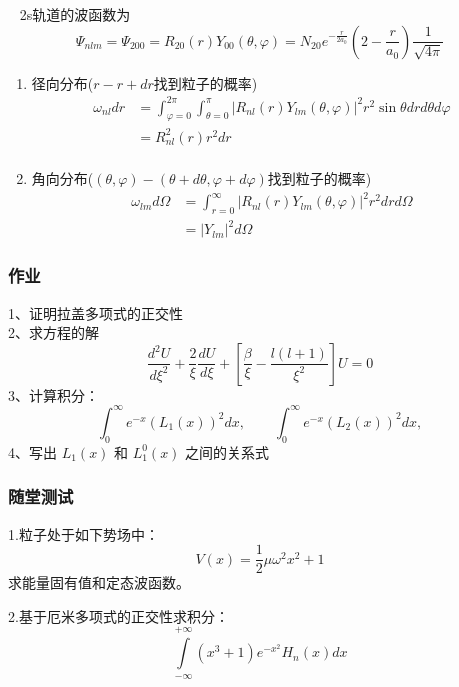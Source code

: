\begin{frame}
	  \frametitle{}
	  \例 [1.求2s轨道的形态]{}
	  \解~ 2s轨道的波函数为\[  \Psi_{nlm} = \Psi_{200} = R_{20} (r) Y_{00}(\theta,\varphi) = N_{20} e^{-\frac{r}{2a_0}} (2-\frac{r}{a_0})\frac{1}{\sqrt{4\pi}}\]
	  \begin{enumerate}
		  \item 径向分布($r-r+dr$找到粒子的概率)
		   \[ \begin{aligned}
	    \omega_{nl} dr &= \int _{\varphi=0} ^{2\pi} \int _{\theta=0} ^{\pi} |R_{nl}(r)Y_{lm}(\theta,\varphi)|^2 r^2\sin \theta dr d\theta d \varphi \\
		&= R^2_{nl}(r) r^2 dr \\
		\end{aligned}\]
		\item 角向分布($(\theta,\varphi)-(\theta+d\theta,\varphi+d\varphi)$找到粒子的概率)		
		\[ \begin{aligned}
			\omega_{lm} d \Omega &= \int _{r=0} ^{\infty} |R_{nl}(r)Y_{lm}(\theta,\varphi)|^2 r^2dr  d \Omega \\
			&= |Y_{lm}|^2 d \Omega 	
			\end{aligned}\]		
	  \end{enumerate}  
\end{frame}
\begin{frame}
	\frametitle{作业}
	1、证明拉盖多项式的正交性\\
	2、求方程的解
	\begin{equation*}
		\frac{d^2 U}{d \xi ^2} + \frac{2}{\xi }\frac{d U }{d \xi}  +[\frac{\beta}{\xi} - \frac{l(l+1)}{\xi ^2}] U=0
	\end{equation*}	 
	3、计算积分：
	\begin{equation*}
		\int_{0}^{\infty}   e^{-x} ( L_1 (x) )^2 dx, \qquad  \int_{0}^{\infty}   e^{-x} ( L_2 (x) )^2 dx, 
	\end{equation*}	
	4、写出 $L_1 (x)$ 和 $L_1 ^0 (x)$ 之间的关系式
\end{frame}		

\begin{frame}
	\frametitle{随堂测试}
	\begin{exampleblock} {1.粒子处于如下势场中：}
		\begin{equation*}
			V(x)= \frac{1}{2} \mu \omega ^2 x^2  +1
		\end{equation*}
		\hspace{2em}求能量固有值和定态波函数。
	\end{exampleblock}	
	\begin{exampleblock} {2.基于厄米多项式的正交性求积分：}
		\begin{equation*}
			\int\limits_{-\infty}^{+\infty} (x^3 +1)e^{-x^{2}} H_n(x) d x 
		\end{equation*}
	\end{exampleblock}	
\end{frame}